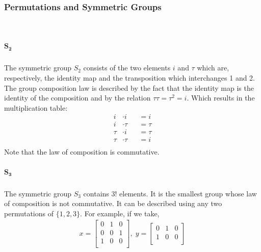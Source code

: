 \documentclass[MathsNotesBase.tex]{subfiles}
\begin{document}
{		\subsubsection{Permutations and Symmetric Groups}\bigskip
		\\
		\subparagraph{$\bm{S_2}$}
		The symmetric group $S_2$ consists of the two elements $i$ and $\tau$ which are, respectively, the identity map and the transposition which interchanges 1 and 2. The group composition law is described by the fact that the identity map is the identity of the composition and by the relation $\tau\tau = \tau^2 = i$. Which results in the multiplication table:	
		\[
		\begin{aligned}
			i &\cdot i &&= i \\
			i &\cdot \tau &&= \tau \\		
			\tau &\cdot i &&= \tau \\
			\tau &\cdot \tau &&= i \\
		\end{aligned}
		\]
		Note that the law of composition is commutative.
		\subparagraph{$\bm{S_3}$}\label{S_3}
		The symmetric group $S_3$ contains $3!$ elements. It is the smallest group whose law of composition is not commutative. It can be described using any two permutations of $\{1, 2, 3\}$. For example, if we take,
		\begin{align*}
			x =
			\begin{bmatrix}
			0 & 1 & 0 \\
			0 & 0 & 1 \\
			1 & 0 & 0 \\
			\end{bmatrix},\;
			y =
			\begin{bmatrix}
			0 & 1 & 0 \\
			1 & 0 & 0 \\

\end{bmatrix}
\end{align*}}
\end{document}
